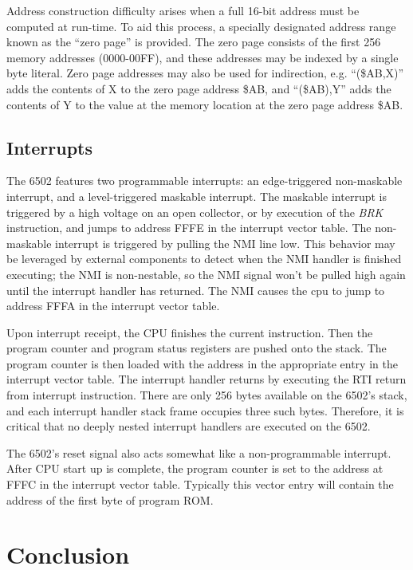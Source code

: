\documentclass[journal]{IEEEtran}
\begin{document}
Address construction difficulty arises when a full 16-bit address must be
computed at run-time. To aid this process, a specially designated address range
known as the ``zero page'' is provided. The zero page consists of the first 256
memory addresses (0000-00FF), and these addresses may be indexed by a single
byte literal. Zero page addresses may also be used for indirection, e.g.
``(\$AB,X)'' adds the contents of X to the zero page address \$AB, and
``(\$AB),Y'' adds the contents of Y to the value at the memory location at the
zero page address \$AB.

\subsection{Interrupts}

The 6502 features two programmable interrupts: an edge-triggered non-maskable
interrupt, and a level-triggered maskable interrupt. The maskable interrupt
is triggered by a high voltage on an open collector, or by execution of the
\emph{BRK} instruction, and jumps to address FFFE in the interrupt vector table.
The non-maskable interrupt is triggered by pulling the NMI line low. This
behavior may be leveraged by external components to detect when the NMI handler
is finished executing; the NMI is non-nestable, so the NMI signal won't be
pulled high again until the interrupt handler has returned. The NMI causes the
cpu to jump to address FFFA in the interrupt vector table.

Upon interrupt receipt, the CPU finishes the current instruction. Then the
program counter and program status registers are pushed onto the stack. The
program counter is then loaded with the address in the appropriate entry in the
interrupt vector table. The interrupt handler returns by executing the
RTI return from interrupt instruction. There are only 256 bytes
available on the 6502's stack, and each interrupt handler stack frame occupies
three such bytes. Therefore, it is critical that no deeply nested interrupt
handlers are executed on the 6502.

The 6502's reset signal also acts somewhat like a non-programmable interrupt.
After CPU start up is complete, the program counter is set to the address at
FFFC in the interrupt vector table. Typically this vector entry will contain
the address of the first byte of program ROM.

\section{Conclusion}
\end{document}
